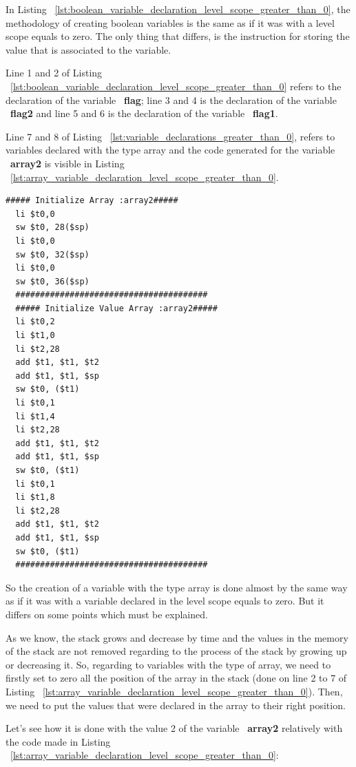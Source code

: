 \documentclass[
  oneside,
  11pt, a4paper,
  footinclude=true,
  headinclude=true,
  cleardoublepage=empty
]{scrbook}
\begin{document}
In Listing ~\ref{lst:boolean_variable_declaration_level_scope_greater_than_0}, the methodology of creating boolean variables is the same as if it was with a level scope equals to zero. The only thing that differs, is the instruction for storing the value that is associated to the variable.

Line 1 and 2 of Listing ~\ref{lst:boolean_variable_declaration_level_scope_greater_than_0} refers to the declaration of the variable ~\textbf{flag}; line 3 and 4 is the declaration of the variable ~\textbf{flag2} and line 5 and 6 is the declaration of the variable ~\textbf{flag1}.

Line 7 and 8 of Listing ~\ref{lst:variable_declarations_greater_than_0}, refers to variables declared with the type array and the code generated for the variable ~\textbf{array2} is visible in Listing ~\ref{lst:array_variable_declaration_level_scope_greater_than_0}.

\begin{lstlisting}[caption={Declaring array variables in level scope greater than 0},label={lst:array_variable_declaration_level_scope_greater_than_0}]
  ##### Initialize Array :array2#####
  li $t0,0		
  sw $t0, 28($sp)
  li $t0,0		
  sw $t0, 32($sp)
  li $t0,0		
  sw $t0, 36($sp)
  #######################################
  ##### Initialize Value Array :array2#####
  li $t0,2		
  li $t1,0		
  li $t2,28		
  add $t1, $t1, $t2	
  add $t1, $t1, $sp
  sw $t0, ($t1)
  li $t0,1		
  li $t1,4		
  li $t2,28		
  add $t1, $t1, $t2	
  add $t1, $t1, $sp
  sw $t0, ($t1)
  li $t0,1		
  li $t1,8		
  li $t2,28		
  add $t1, $t1, $t2	
  add $t1, $t1, $sp
  sw $t0, ($t1)
  #######################################
\end{lstlisting}

So the creation of a variable with the type array is done almost by the same way as if it was with a variable declared in the level scope equals to zero.
But it differs on some points which must be explained.

As we know, the stack grows and decrease by time and the values in the memory of the stack are not removed regarding to the process of the stack by growing up or decreasing it. So, regarding to variables with the type of array, we need to firstly set to zero all the position of the array in the stack (done on line 2 to 7 of Listing ~\ref{lst:array_variable_declaration_level_scope_greater_than_0}). Then, we need to put the values that were declared in the array to their right position.

Let's see how it is done with the value 2 of the variable ~\textbf{array2} relatively with the code made in Listing ~\ref{lst:array_variable_declaration_level_scope_greater_than_0}:
\end{document}
